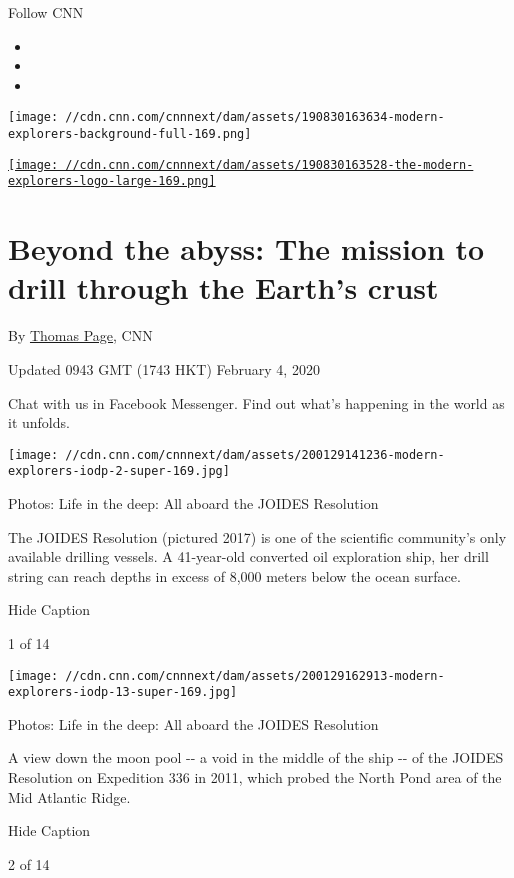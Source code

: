 Follow CNN

\begin{itemize}
\item
\item
\item
\end{itemize}

\texttt{[image: //cdn.cnn.com/cnnnext/dam/assets/190830163634-modern-explorers-background-full-169.png]}

\href{/specials/world/the-modern-explorers}{\texttt{[image: //cdn.cnn.com/cnnnext/dam/assets/190830163528-the-modern-explorers-logo-large-169.png]}}

\hypertarget{beyond-the-abyss-the-mission-to-drill-through-the-earths-crust}{%
\section{Beyond the abyss: The mission to drill through the Earth's
crust}\label{beyond-the-abyss-the-mission-to-drill-through-the-earths-crust}}

By \href{/profiles/thomas-page}{Thomas Page}, CNN

Updated 0943 GMT (1743 HKT) February 4, 2020

Chat with us in Facebook Messenger. Find out what's happening in the
world as it unfolds.

\texttt{[image: //cdn.cnn.com/cnnnext/dam/assets/200129141236-modern-explorers-iodp-2-super-169.jpg]}

Photos: Life in the deep: All aboard the JOIDES Resolution

The JOIDES Resolution (pictured 2017) is one of the scientific
community's only available drilling vessels. A 41-year-old converted oil
exploration ship, her drill string can reach depths in excess of 8,000
meters below the ocean surface.

Hide Caption

1 of 14

\texttt{[image: //cdn.cnn.com/cnnnext/dam/assets/200129162913-modern-explorers-iodp-13-super-169.jpg]}

Photos: Life in the deep: All aboard the JOIDES Resolution

A view down the moon pool -\/- a void in the middle of the ship -\/- of
the JOIDES Resolution on Expedition 336 in 2011, which probed the North
Pond area of the Mid Atlantic Ridge.

Hide Caption

2 of 14

